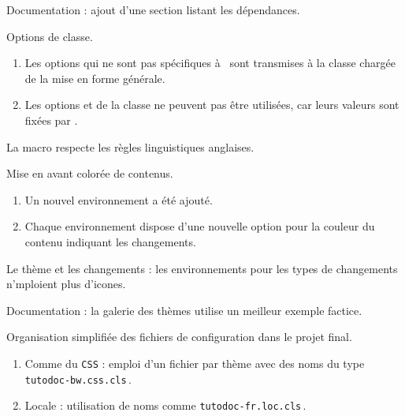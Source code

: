 \begin{tdocnew}
	\item Documentation : ajout d'une section listant les dépendances.

	\item Options de classe.
	\begin{enumerate}
		\item Les options qui ne sont pas spécifiques à \thisproj\ sont transmises à la classe chargée de la mise en forme générale.

		\item Les options  et  de la classe  ne peuvent pas être utilisées, car leurs valeurs sont fixées par \thisproj.
	\end{enumerate}

	\item La macro  respecte les règles linguistiques anglaises.

	\item Mise en avant colorée de contenus.
	\begin{enumerate}
		\item Un nouvel environnement  a été ajouté.

		\item Chaque environnement dispose d'une nouvelle option  pour la couleur du contenu indiquant les changements.
	\end{enumerate}
\end{tdocnew}


\begin{tdocupdate}
	\item Le thème  et les changements : les environnements pour les types de changements n'mploient plus d'icones.

	\item Documentation : la galerie des thèmes utilise un meilleur exemple factice.
\end{tdocupdate}



\begin{tdoctech}
	\item Organisation simplifiée des fichiers de configuration dans le projet final.
	\begin{enumerate}
		\item Comme du \texttt{CSS} : emploi d'un fichier par thème avec des noms du type \texttt{tutodoc-bw.css.cls}\,.


		\item Locale : utilisation de noms comme \texttt{tutodoc-fr.loc.cls}\,.
	\end{enumerate}
\end{tdoctech}

